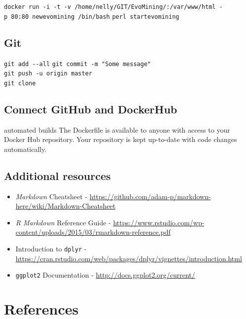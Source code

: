 \documentclass[12pt,twoside]{reedthesis}
\begin{document}
  \texttt{docker\ run\ -i\ -t\ -v\ /home/nelly/GIT/EvoMining/:/var/www/html\ -p\ 80:80\ newevomining\ /bin/bash}
  \texttt{perl\ startevomining}
  
  \section{Git}\label{git}
  
  \texttt{git\ add\ -\/-all} \texttt{git\ commit\ -m\ "Some\ message"}\\
  \texttt{git\ push\ -u\ origin\ master}\\
  \texttt{git\ clone}
  
  \section{Connect GitHub and
  DockerHub}\label{connect-github-and-dockerhub}
  
  automated builds The Dockerfile is available to anyone with access to
  your Docker Hub repository. Your repository is kept up-to-date with code
  changes automatically.
  
  \section{Additional resources}\label{additional-resources}
  
  \begin{itemize}
  \item
    \emph{Markdown} Cheatsheet -
    \url{https://github.com/adam-p/markdown-here/wiki/Markdown-Cheatsheet}
  \item
    \emph{R Markdown} Reference Guide -
    \url{https://www.rstudio.com/wp-content/uploads/2015/03/rmarkdown-reference.pdf}
  \item
    Introduction to \texttt{dplyr} -
    \url{https://cran.rstudio.com/web/packages/dplyr/vignettes/introduction.html}
  \item
    \texttt{ggplot2} Documentation -
    \url{http://docs.ggplot2.org/current/}
  \end{itemize}
  
  \backmatter
  
  \chapter{References}\label{references}
  
  \noindent
  
  \setlength{\parindent}{-0.20in} \setlength{\leftskip}{0.20in}
  \setlength{\parskip}{8pt}
  
\end{document}
